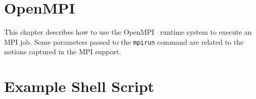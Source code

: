 %
%
\label{chp-mpijob}
\section{OpenMPI}

This chapter describes how to use the OpenMPI~\cite{openmpi} runtime system
to execute an MPI job. Some parameters passed to the \texttt{mpirun} command
are related to the notions captured in the \lname MPI support.

\section{Example Shell Script}

